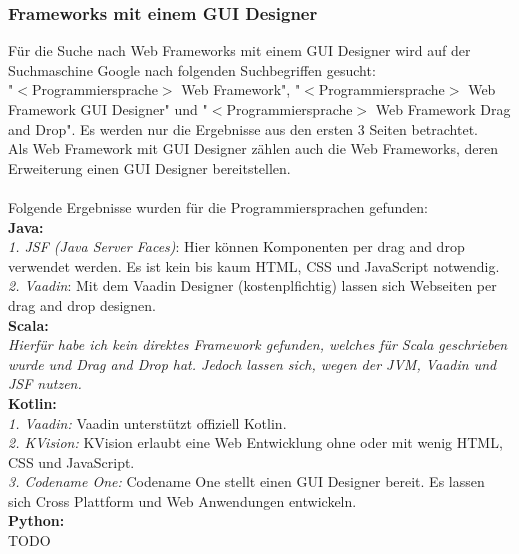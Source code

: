 \documentclass[ngerman]{article}
\begin{document}
    \subsubsection{Frameworks mit einem GUI Designer}
    \label{GrundlagenWebFrameworksWithGUIDesigner}
    Für die Suche nach Web Frameworks mit einem GUI Designer wird auf der Suchmaschine Google nach folgenden Suchbegriffen gesucht:\\
    "$<$Programmiersprache$>$ Web Framework", "$<$Programmiersprache$>$ Web Framework GUI Designer" und "$<$Programmiersprache$>$ Web Framework Drag and Drop". Es werden nur die Ergebnisse aus den ersten 3 Seiten betrachtet.\\
    Als Web Framework mit GUI Designer zählen auch die Web Frameworks, deren Erweiterung einen GUI Designer bereitstellen.\\\\
    Folgende Ergebnisse wurden für die Programmiersprachen gefunden:\\
    \textbf{Java:}\\
    \textit{1. JSF (Java Server Faces)}: Hier können Komponenten per drag and drop verwendet werden. Es ist kein bis kaum HTML, CSS und JavaScript notwendig. \cite{JavaWebFramework1}\\
    \textit{2. Vaadin}: Mit dem Vaadin Designer (kostenplfichtig) lassen sich Webseiten per drag and drop designen. \cite{JavaVaadinDesigner}\\
    \textbf{Scala:}\\
    \textit{Hierfür habe ich kein direktes Framework gefunden, welches für Scala geschrieben wurde und Drag and Drop hat. Jedoch lassen sich, wegen der JVM, Vaadin und JSF nutzen.}\\
    \textbf{Kotlin:}\\
    \textit{1. Vaadin:} Vaadin unterstützt offiziell Kotlin. \cite{KotlinVaadin}\\
    \textit{2. KVision:} KVision erlaubt eine Web Entwicklung ohne oder mit wenig HTML, CSS und JavaScript. \cite{Kotlin KVision}\\
    \textit{3. Codename One:} Codename One stellt einen GUI Designer bereit. Es lassen sich Cross Plattform und Web Anwendungen entwickeln. \cite{Kotlin Codename One}\\
    \textbf{Python:}\\
    TODO
    \newpage\noindent
\end{document}

